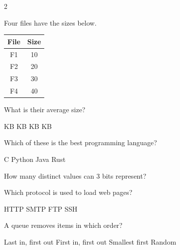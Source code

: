 \documentclass{exam}
\newcounter{savedq}
\newcommand{\qsave}{\setcounter{savedq}{\value{question}}}
\begin{document}
\begin{multicols}{2}
\begin{questions}

\question
Four files have the sizes below.

\begin{center}
\begin{tabular}{cc}
\hline
File & Size \\
\hline
F1 & 10 \\
F2 & 20 \\
F3 & 30 \\
F4 & 40 \\
\hline
\end{tabular}
\end{center}

What is their average size?
\begin{choices}
     KB
     KB
     KB
     KB
\end{choices}

\question
Which of these is the best programming language?
\begin{choices}
    \choice C
    \choice Python
    \choice Java
    \choice Rust
\end{choices}

\question
How many distinct values can 3 bits represent?
\begin{choices}
\end{choices}

\question
Which protocol is used to load web pages?
\begin{choices}
    \correctchoice HTTP
    \choice SMTP
    \choice FTP
    \choice SSH
\end{choices}

\question
A queue removes items in which order?
\begin{choices}
    \choice Last in, first out
    \correctchoice First in, first out
    \choice Smallest first
    \choice Random
\end{choices}

\qsave
\end{questions}
\end{multicols}

\clearpage
\end{document}
